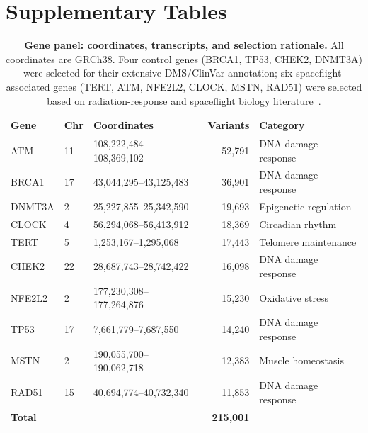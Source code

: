 \documentclass[11pt]{article}
\begin{document}
\clearpage
\section{Supplementary Tables}
\label{sec:supp_tables}

\begin{table}[h]
  \centering
  \caption{\textbf{Gene panel: coordinates, transcripts, and selection rationale.}
    All coordinates are GRCh38. Four control genes (BRCA1, TP53, CHEK2, DNMT3A) were
    selected for their extensive DMS/ClinVar annotation; six spaceflight-associated genes
    (TERT, ATM, NFE2L2, CLOCK, MSTN, RAD51) were selected based on radiation-response
    and spaceflight biology literature~\cite{Rutter_2024,daSilveira_2020}.}
  \label{tab:gene_panel}
  \small
  \begin{tabular}{lllrl}
    \toprule
    Gene & Chr & Coordinates & Variants & Category \\
    \midrule
    ATM     & 11 & 108,222,484--108,369,102 & 52,791 & DNA damage response \\
    BRCA1   & 17 & 43,044,295--43,125,483  & 36,901 & DNA damage response \\
    DNMT3A  & 2  & 25,227,855--25,342,590  & 19,693 & Epigenetic regulation \\
    CLOCK   & 4  & 56,294,068--56,413,912  & 18,369 & Circadian rhythm \\
    TERT    & 5  & 1,253,167--1,295,068    & 17,443 & Telomere maintenance \\
    CHEK2   & 22 & 28,687,743--28,742,422  & 16,098 & DNA damage response \\
    NFE2L2  & 2  & 177,230,308--177,264,876 & 15,230 & Oxidative stress \\
    TP53    & 17 & 7,661,779--7,687,550    & 14,240 & DNA damage response \\
    MSTN    & 2  & 190,055,700--190,062,718 & 12,383 & Muscle homeostasis \\
    RAD51   & 15 & 40,694,774--40,732,340  & 11,853 & DNA damage response \\
    \midrule
    \multicolumn{3}{l}{\textbf{Total}} & \textbf{215,001} & \\
    \bottomrule
  \end{tabular}
\end{table}
\end{document}
